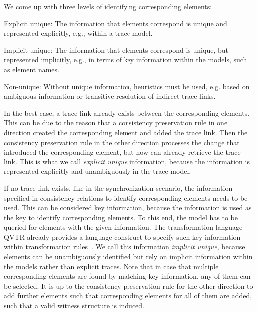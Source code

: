 We come up with three levels of identifying corresponding elements:
\begin{properdescription}
    \item[Explicit unique:] The information that elements correspond is unique and represented explicitly, e.g., within a trace model. %
    \item[Implicit unique:] The information that elements correspond is unique, but represented implicitly, e.g., in terms of key information within the models, such as element names. %
    \item[Non-unique:] Without unique information, heuristics must be used, e.g. based on ambiguous information or transitive resolution of indirect trace links.
\end{properdescription}

In the best case, a trace link already exists between the corresponding elements. This can be due to the reason that a consistency preservation rule in one direction created the corresponding element and added the trace link. Then the consistency preservation rule in the other direction processes the change that introduced the corresponding element, but now can already retrieve the trace link.
This is what we call \emph{explicit unique} information, because the information is represented explicitly and unambiguously in the trace model.

If no trace link exists, like in the synchronization scenario, the information specified in consistency relations to identify corresponding elements needs to be used.
This can be considered key information, because the information is used as the key to identify corresponding elements.
To this end, the model has to be queried for elements with the given information.
The transformation language \gls{QVTR} already provides a language construct to specify such key information within transformation rules~\cite[7.10.2.]{qvt}.
We call this information \emph{implicit unique}, because elements can be unambiguously identified but rely on implicit information within the models rather than explicit traces.
Note that in case that multiple corresponding elements are found by matching key information, any of them can be selected.
It is up to the consistency preservation rule for the other direction to add further elements such that corresponding elements for all of them are added, such that a valid witness structure is induced.

